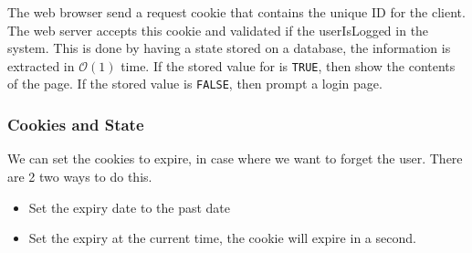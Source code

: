 The web browser send a request cookie that contains the unique ID for the client. The web server accepts this cookie and validated if the userIsLogged in the system. This is done by having a state stored on a database, the information is extracted in $\mathcal{O}(1)$ time. If the stored value for is \texttt{TRUE}, then show the contents of the page. If the stored value is \texttt{FALSE}, then prompt a login page. 

\subsubsection{Cookies and State}
We can set the cookies to expire, in case where we want to forget the user. There are 2 two ways to do this. 

\begin{itemize}[noitemsep, topsep=4pt]
	\item Set the expiry date to the past date 
        \item Set the expiry at the current time, the cookie will expire in a second. 
\end{itemize}


